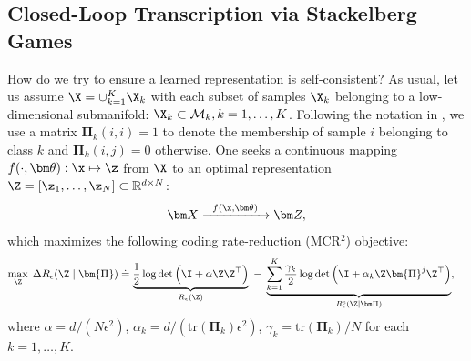 \documentclass[../../book-main.tex]{subfiles}
\begin{document}
\subsection{Closed-Loop Transcription via Stackelberg Games}\label{sec:closed-loop-transcription}



How do we try to ensure a learned representation is self-consistent? As usual, let us assume $\X = \cup_{k=1}^K \X_k$ with each subset of samples $\X_k$ belonging to a low-dimensional submanifold: $\X_k \subset \mathcal{M}_k, k = 1,\ldots, K$. Following the notation in , we use a matrix $\bm \Pi_k(i,i) = 1$ to denote the membership of sample $i$ belonging to class $k$ and $\bm \Pi_k(i,j) = 0$ otherwise. One seeks a continuous mapping $f(\cdot,\bm \theta): \x \mapsto \z$ from $\X$ to an optimal representation $\Z = [\z_1, \ldots, \z_N] \subset \mathbb{R}^{d \times N}$:
\begin{equation}
\bm X  \xrightarrow{\hspace{2mm} f(\x, \bm \theta) \hspace{2mm}} \bm Z, 
\label{eqn:LDR}
\end{equation}
which maximizes the following coding rate-reduction (MCR$^2$) objective:
\begin{equation}\label{eq:mcr2-formulation}
\begin{split}
\max_{\Z} \; \Delta R_\epsilon(\Z  \mid \bm{\Pi}) %
&\doteq \underbrace{\frac{1}{2}\log\det \Big(\I + {\alpha} \Z \Z^\top \Big)}_{R_{\epsilon}(\Z)} \;-\; \underbrace{\sum_{k=1}^{K}\frac{\gamma_k}{2} \log\det\Big(\I + {\alpha_k} \Z \bm{\Pi}^{j} \Z^\top \Big)}_{R^c_{\epsilon}(\Z \mid \bm \Pi)},
\end{split}
\end{equation}
where $\alpha = {d}/({N\epsilon^2})$, $\alpha_k = d/({\mathrm{tr}(\bm{\Pi}_k)\epsilon^2})$, $\gamma_k =  {\mathrm{tr}(\bm{\Pi}_{k})}/{N}$ for each $k = 1,\dots, K$.
\end{document}
